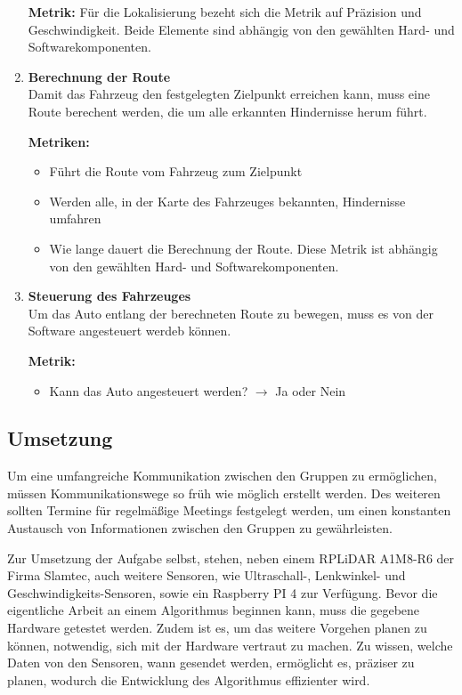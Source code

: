 \begin{enumerate}[leftmargin=*]
    \textbf{Metrik:} Für die Lokalisierung bezeht sich die Metrik auf Präzision und Geschwindigkeit. 
    Beide Elemente sind abhängig von den gewählten Hard- und Softwarekomponenten. 
    \item \textbf{Berechnung der Route}\\
    Damit das Fahrzeug den festgelegten Zielpunkt erreichen kann, muss eine Route berechent werden, die um alle erkannten Hindernisse herum führt.
    
    \textbf{Metriken:}

    \begin{itemize}
        \item Führt die Route vom Fahrzeug zum Zielpunkt
        \item Werden alle, in der Karte des Fahrzeuges bekannten, Hindernisse umfahren
        \item Wie lange dauert die Berechnung der Route. Diese Metrik ist abhängig von den gewählten Hard- und Softwarekomponenten.
    \end{itemize}

    \item \textbf{Steuerung des Fahrzeuges}\\
    Um das Auto entlang der berechneten Route zu bewegen, muss es von der Software angesteuert werdeb können.

    \textbf{Metrik:}
    \begin{itemize}
        \item Kann das Auto angesteuert werden? $\to$ Ja oder Nein
    \end{itemize}
\end{enumerate}

\subsection{Umsetzung}
Um eine umfangreiche Kommunikation zwischen den Gruppen zu ermöglichen, müssen Kommunikationswege so früh wie möglich erstellt werden.
Des weiteren sollten Termine für regelmäßige Meetings festgelegt werden, um einen konstanten Austausch von Informationen zwischen den Gruppen zu gewährleisten.

Zur Umsetzung der Aufgabe selbst, stehen, neben einem RPLiDAR A1M8-R6 der Firma Slamtec, auch weitere Sensoren, 
wie Ultraschall-, Lenkwinkel- und Geschwindigkeits-Sensoren, sowie ein Raspberry PI 4 zur Verfügung.
Bevor die eigentliche Arbeit an einem Algorithmus beginnen kann, muss die gegebene Hardware getestet werden. 
Zudem ist es, um das weitere Vorgehen planen zu können, notwendig, sich mit der Hardware vertraut zu machen. 
Zu wissen, welche Daten von den Sensoren, wann gesendet werden, ermöglicht es, präziser zu planen, wodurch die Entwicklung des Algorithmus effizienter wird.

